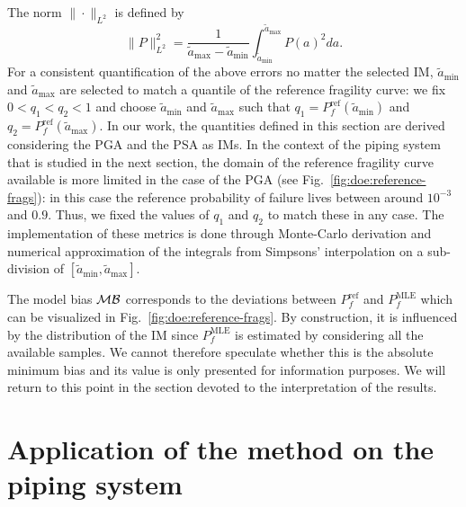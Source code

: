 The norm $\|\cdot\|_{L^2}$ is defined by 
    \begin{equation}
        \|P\|_{L^2}^2 = \frac{1}{\tilde a_{\max}-\tilde a_{\min}}\int_{\tilde a_{\min}}^{\tilde a_{\max}}P(a)^2da. \nonumber
    \end{equation}
For a consistent quantification of the above errors no matter the selected IM, $\tilde a_{\min}$ and $\tilde a_{\max}$ are selected to match a quantile of the reference fragility curve:
we fix $0<q_1<q_2<1$ and choose $\tilde a_{\min}$ and $\tilde a_{\max}$ such that $q_1=P^{\text{ref}}_f(\tilde a_{\min})$ and $q_2=P^{\text{ref}}_f(\tilde a_{\max})$. In our work, the quantities defined in this section are derived considering the PGA and the PSA as IMs.
In the context of the piping system that is studied in the next section, 
the domain of the reference fragility curve available is more limited in the case of the PGA (see Fig.~\ref{fig:doe:reference-frags}): in this case the reference probability of failure lives between around $10^{-3} $ and $0.9$.
Thus, we fixed the values of $q_1$ and $q_2$ to match these in any case. The implementation of these metrics is done through Monte-Carlo derivation and numerical approximation of the integrals from Simpsons' interpolation on a sub-division of $[\tilde a_{\min},\tilde a_{\text{max}}]$.

{The model bias $\mathcal{M}\mathcal{B}$ corresponds to the deviations between $P_f^{\text{ref}}$ and $P_f^{\text{MLE}}$ which can be visualized in Fig.~\ref{fig:doe:reference-frags}. By construction, it is influenced by the distribution of the IM since $P_f^{\text{MLE}}$ is estimated by considering all the available samples. We cannot therefore speculate whether this is the absolute minimum bias and its value is only presented for information purposes. We will return to this point in the section devoted to the interpretation of the results.}






\section{Application of the method on the piping system}\label{sec:doe:application}


